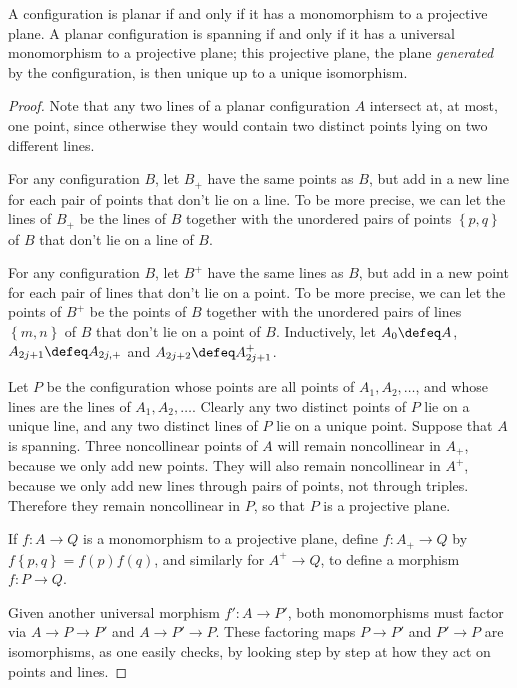 \begin{lemma}
A configuration is planar if and only if it has a monomorphism to a projective plane.
A planar configuration is spanning if and only if it has a universal monomorphism to a projective plane; this projective plane, the plane \emph{generated} by the configuration, is then unique up to a unique isomorphism.
\end{lemma}
\begin{proof}
Note that any two lines of a planar configuration \(A\) intersect at, at most, one point, since otherwise they would contain two distinct points lying  on two different lines.

For any configuration \(B\), let \(B_+\) have the same points as \(B\), but add in a new line for each pair of points that don't lie on a line.
To be more precise, we can let the lines of \(B_+\) be the lines of \(B\) together with the unordered pairs of points \(\left\{p,q\right\}\) of \(B\) that don't lie on a line of \(B\).

For any configuration \(B\), let \(B^+\) have the same lines as \(B\), but add in a new point for each pair of lines that don't lie on a point.
To be more precise, we can let the points of \(B^+\) be the points of \(B\) together with the unordered pairs of lines \(\left\{m,n\right\}\) of \(B\) that don't lie on a point of \(B\).
Inductively, let \(A_0 \defeq A\), \(A_{2j+1} \defeq A_{2j,+}\) and \(A_{2j+2} \defeq A_{2j+1}^+\).

Let \(P\) be the configuration whose points are all points of \(A_1, A_2, \dots\), and whose lines are the lines of \(A_1, A_2, \dots\).
Clearly any two distinct points of \(P\) lie on a unique line, and any two distinct lines of \(P\) lie on a unique point.
Suppose that \(A\) is spanning.
Three noncollinear points of \(A\) will remain noncollinear in \(A_+\), because we only add new points.
They will also remain noncollinear in \(A^+\), because we only add new lines through pairs of points, not through triples.
Therefore they remain noncollinear in \(P\), so that \(P\) is a projective plane.

If \(f \colon A \to Q\) is a monomorphism to a projective plane, define \(f \colon A_+ \to Q\) by \(f\left\{p,q\right\}=f(p)f(q)\), and similarly for \(A^+ \to Q\), to define a morphism \(f \colon P \to Q\).

Given another universal morphism \(f' \colon A \to P'\), both monomorphisms must factor via \(A \to P \to P'\) and \(A \to P' \to P\).
These factoring maps \(P \to P'\) and \(P' \to P\) are isomorphisms, as one easily checks, by looking step by step at how they act on points and lines.
\end{proof}

